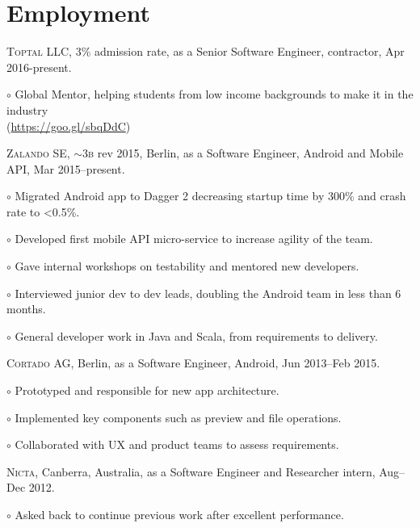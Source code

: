 \documentclass[letterpaper]{article}
\renewenvironment{itemize}{
  \begin{list}{}{
    \setlength{\leftmargin}{1.5em}
  }
}{
  \end{list}
}
\newenvironment{no-indent-itemize}{
  \begin{list}{}{
    \setlength{\leftmargin}{0em}
  }
}{
  \end{list}
}
\def\tilde{$\scriptstyle\sim$}
\def\bullet{$\circ$\xspace}
\begin{document}
\section*{Employment}
\begin{no-indent-itemize}
  \item \textsc{Toptal LLC}, 3\% admission rate, as a Senior Software Engineer, contractor, Apr 2016-present.
  \begin{itemize}
    \item\bullet Global Mentor, helping students from low income backgrounds to make it in the industry \\  
    \phantom{\bullet }(\href{https://goo.gl/sbqDdC}{https://goo.gl/sbqDdC})
  \end{itemize}
  \item \textsc{Zalando SE}, \tilde 3\textsc{b} rev 2015, Berlin, as a Software Engineer, 
         Android and Mobile API, Mar 2015--present. 
  \begin{itemize}
	\item\bullet Migrated Android app to Dagger 2 decreasing startup time by 300\% and crash rate to <0.5\%.
	\item\bullet Developed first mobile API micro-service to increase agility of the team.
	\item\bullet Gave internal workshops on testability and mentored new developers.
	\item\bullet Interviewed junior dev to dev leads, doubling the Android team in less than 6 months.	
	\item\bullet General developer work in Java and Scala, from requirements to delivery.
  \end{itemize}
  \item \textsc{Cortado AG}, Berlin, as a Software Engineer, Android, Jun 2013--Feb 2015.
  \begin{itemize}
    \item\bullet Prototyped and responsible for new app architecture.
    \item\bullet Implemented key components such as preview and file operations.
    \item\bullet Collaborated with UX and product teams to assess requirements.
  \end{itemize}
  \item \textsc{Nicta}, Canberra, Australia, as a Software Engineer and Researcher intern, Aug--Dec 2012. 
  \begin{itemize}
	\item\bullet Asked back to continue previous work after excellent performance.

\end{itemize}
\end{no-indent-itemize}
\end{document}
